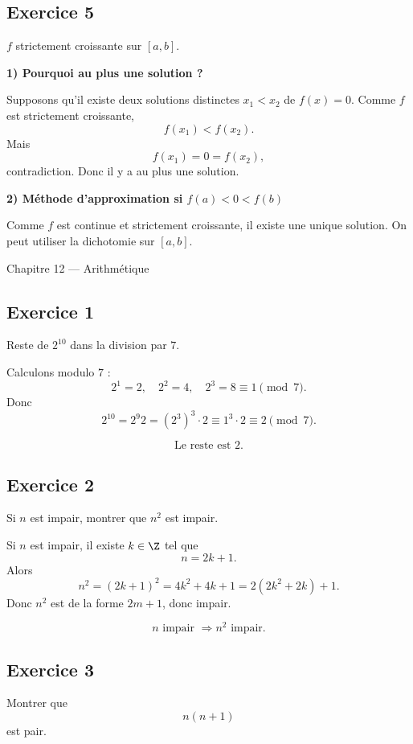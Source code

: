 \documentclass[11pt,a4paper]{article}
\begin{document}
\subsection*{Exercice 5}
\(f\) strictement croissante sur \([a,b]\).

\textbf{1) Pourquoi au plus une solution ?}

Supposons qu'il existe deux solutions distinctes \(x_1<x_2\) de \(f(x)=0\).  
Comme \(f\) est strictement croissante,
\[
f(x_1)<f(x_2).
\]
Mais
\[
f(x_1)=0=f(x_2),
\]
contradiction. Donc il y a au plus une solution.

\textbf{2) Méthode d'approximation si \(f(a)<0<f(b)\)}

Comme \(f\) est continue et strictement croissante, il existe une unique solution.  
On peut utiliser la dichotomie sur \([a,b]\).

\begin{chapitrebox}{Chapitre 12 --- Arithmétique}
\end{chapitrebox}

\subsection*{Exercice 1}
Reste de \(2^{10}\) dans la division par \(7\).

Calculons modulo \(7\) :
\[
2^1=2,\quad 2^2=4,\quad 2^3=8\equiv 1 \pmod 7.
\]
Donc
\[
2^{10}=2^{9}2=(2^3)^3\cdot 2 \equiv 1^3\cdot 2\equiv 2 \pmod 7.
\]

\[
\boxed{\text{Le reste est } 2.}
\]

\subsection*{Exercice 2}
Si \(n\) est impair, montrer que \(n^2\) est impair.

Si \(n\) est impair, il existe \(k\in\Z\) tel que
\[
n=2k+1.
\]
Alors
\[
n^2=(2k+1)^2=4k^2+4k+1=2(2k^2+2k)+1.
\]
Donc \(n^2\) est de la forme \(2m+1\), donc impair.

\[
\boxed{n \text{ impair } \Rightarrow n^2 \text{ impair}.}
\]

\subsection*{Exercice 3}
Montrer que
\[
n(n+1)
\]
est pair.
\end{document}
